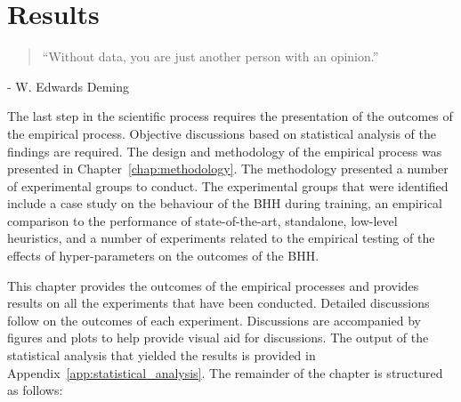 \chapter{Results}
\label{chap:results}

\begin{quotation}
      \noindent ``Without data, you are just another person with an opinion.''
\end{quotation}
\begin{flushright}
      - W. Edwards Deming
\end{flushright}

The last step in the scientific process requires the presentation of the outcomes of the empirical process. Objective discussions based on statistical analysis of the findings are required. The design and methodology of the empirical process was presented in Chapter~\ref{chap:methodology}. The methodology presented a number of experimental groups to conduct. The experimental groups that were identified include a case study on the behaviour of the \acs{BHH} during training, an empirical comparison to the performance of state-of-the-art, standalone, low-level heuristics, and a number of experiments related to the empirical testing of the effects of hyper-parameters on the outcomes of the \acs{BHH}.

This chapter provides the outcomes of the empirical processes and provides results on all the experiments that have been conducted. Detailed discussions follow on the outcomes of each experiment. Discussions are accompanied by figures and plots to help provide visual aid for discussions. The output of the statistical analysis that yielded the results is provided in Appendix~\ref{app:statistical_analysis}. The remainder of the chapter is structured as follows:

